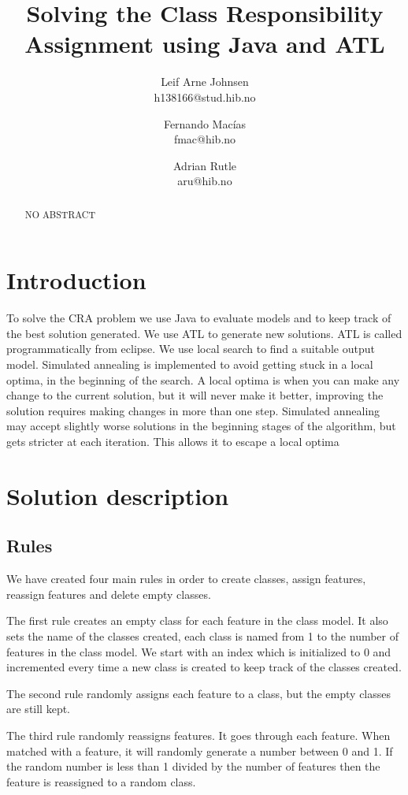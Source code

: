 \documentclass[a4paper]{article}
\title{Solving the Class Responsibility Assignment using Java and ATL}
\author{
Leif Arne Johnsen \\ h138166@stud.hib.no
\and
Fernando Macías \\ fmac@hib.no
\and
Adrian Rutle \\ aru@hib.no
}
\begin{document}
\maketitle

\begin{abstract}
NO ABSTRACT~\cite{Bowman2010}
\end{abstract}


\section{Introduction}

To solve the CRA problem we use Java to evaluate models and to keep track of
the best solution generated.
We use ATL to generate new solutions. ATL is called
programmatically from eclipse.
We use local search to find a suitable output
model.
Simulated annealing is implemented to avoid getting stuck in a local
optima, in the beginning of the search.
A local optima is when you can make
any change to the current solution, but it will never make it better, improving
the solution requires making changes in more than one step.
Simulated
annealing may accept slightly worse solutions in the beginning stages of the
algorithm, but gets stricter at each iteration.
This allows it to escape a local
optima

\section{Solution description}

\subsection{Rules}

We have created four main rules in order to create classes, assign features, reassign features and delete empty classes.

The first rule creates an empty class for each feature in the class model.
It also sets the name of the classes created, each class is named from 1 to the number of features in the class model.
We start with an index which is initialized to 0 and incremented every time a new class is created to keep track of the classes created.

The second rule randomly assigns each feature to a class, but the empty classes are still kept.

The third rule randomly reassigns features.
It goes through each feature.
When matched with a feature, it will randomly generate a number between 0 and 1.
If the random number is less than 1 divided by the number of features then the feature is reassigned to a random class.
\end{document}
